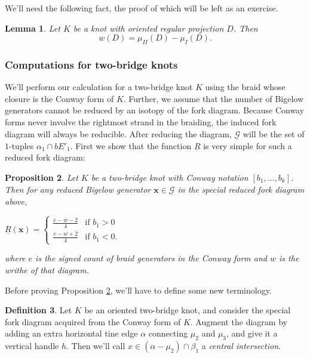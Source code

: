 \documentclass[11pt]{article}
\theoremstyle{plain} \newtheorem{thm}{Theorem}[subsection]
\theoremstyle{plain} \newtheorem{cor}[thm]{Corollary}
\theoremstyle{plain} \newtheorem{prop}[thm]{Proposition}
\theoremstyle{plain} \newtheorem{conj}[thm]{Conjecture}
\theoremstyle{plain} \newtheorem{lem}[thm]{Lemma}
\theoremstyle{definition} \newtheorem{df}[thm]{Definition}
\theoremstyle{remark} \newtheorem{rmk}[thm]{Remark}
\theoremstyle{remark} \newtheorem{obs}[thm]{Observation}
\newcommand{\G}{\mathcal{G}}
\newcommand{\red}[1]{\underline{#1}}
\newcommand{\bx}{\mathbf{x}}
\numberwithin{equation}{section}
\begin{document}
We'll need the following fact, the proof of which will be left as an exercise.
\begin{lem}\label{writhelem}
Let $K$ be a knot with oriented regular projection $D$.  Then
\begin{equation*}
w(D) = \mu_{II}(D) - \mu_{I}(D).
\end{equation*}
\end{lem}

\subsubsection{Computations for two-bridge knots}

We'll perform our calculation for a two-bridge knot $K$ using the braid whose closure is the Conway form of $K$.  Further, we assume that the number of Bigelow generators cannot be reduced by an isotopy of the fork diagram.  Because Conway forms never involve the rightmost strand in the braiding, the induced fork diagram will always be reducible.  After reducing the diagram, $\red{\G}$ will be the set of $1$-tuples $\alpha_{1} \cap bE'_{1}$.  First we show that the function $\red{R}$ is very simple for such a reduced fork diagram:

\begin{prop}\label{prop:Rtildeprop}
Let $K$ be a two-bridge knot with Conway notation $[b_{1}, \ldots, b_{k}]$.  Then for any reduced Bigelow generator $\bx \in \red{\G}$ in the special reduced fork diagram above,

\begin{center}
$\red{R}(\bx) =
 \begin{cases} 
\frac{e - w - 2}{4}& \text{if $b_{1} > 0$}\\ 
\frac{e - w + 2}{4}& \text{if $b_{1} < 0$}.
\end{cases}$
\end{center}
where $e$ is the signed count of braid generators in the Conway form and $w$ is the writhe of that diagram.
\end{prop}

Before proving Proposition \ref{prop:Rtildeprop}, we'll have to define some new terminology.

\begin{df}
Let $K$ be an oriented two-bridge knot, and consider the special fork diagram acquired from the Conway form of $K$.  Augment the diagram by adding an extra horizontal tine edge $\alpha$ connecting $\mu_{2}$ and $\mu_{3}$, and give it a vertical handle $h$.  Then we'll call $x \in \left(\alpha - \mu_{2} \right) \cap \beta_{1}$ a \textit{central intersection}.
\end{df}
\end{document}
